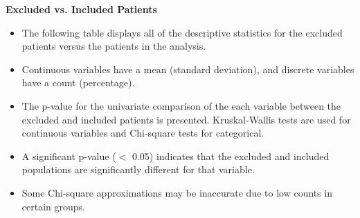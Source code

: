 \documentclass[10pt]{article}\usepackage[]{graphicx}\usepackage[]{color}
\begin{document}
\vspace{.5in}
{\bf Excluded vs. Included Patients}\\
\begin{itemize}
  \item The following table displays all of the descriptive statistics for the excluded patients versus the patients in the analysis. 
  \item Continuous variables have a mean (standard deviation), and discrete variables have a count (percentage). 
  \item The p-value for the univariate comparison of the each variable between the excluded and included patients is presented. Kruskal-Wallis tests are used for continuous variables and Chi-square tests for categorical.
  \item A significant p-value ($<$ 0.05) indicates that the excluded and included populations are significantly different for that variable.
  \item Some Chi-square approximations may be inaccurate due to low counts in certain groups.
\end{itemize}
 \clearpage
 \label{sec:table}
\end{document}
